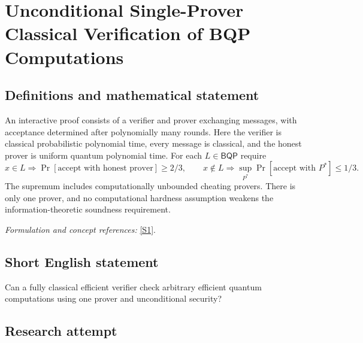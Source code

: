\documentclass[11pt,a4paper]{article}
\newcommand{\sref}[2]{\hyperlink{source:#1:#2}{[S#2]}}
\newif\ifshowcatalogue
\newcommand{\cataloguescope}[1]{\ifshowcatalogue
 \paragraph{Exact scope in the supplied catalogue.}
 \begin{quote}\small #1\end{quote}\fi}
\numberwithin{equation}{section}
\begin{document}
\setcounter{section}{0}
\setlength{\parskip}{3pt plus 1pt}
\clearpage
\section*{\texorpdfstring{Unconditional Single-Prover Classical Verification of BQP Computations}{Unconditional Single-Prover Classical Verification of BQP Computations}}\label{statement}
\subsection{Definitions and mathematical statement}
An interactive proof consists of a verifier and prover exchanging messages, with acceptance determined after polynomially many rounds. Here the verifier is classical probabilistic polynomial time, every message is classical, and the honest prover is uniform quantum polynomial time. For each $L\in\mathsf{BQP}$ require
\[
 x\in L\Rightarrow\Pr[\text{accept with honest prover}]\ge2/3,\qquad
 x\notin L\Rightarrow\sup_{P^*}\Pr[\text{accept with }P^*]\le1/3.
\]
The supremum includes computationally unbounded cheating provers. There is only one prover, and no computational hardness assumption weakens the information-theoretic soundness requirement.
\par\smallskip\textit{Formulation and concept references:} \sref{statement}{1}.
\cataloguescope{Determine whether every language L in BQP admits a polynomial-round interactive proof with only classical messages between a probabilistic classical polynomial-time verifier and a single honest uniform quantum polynomial-time prover, with completeness at least 2/3 and soundness at most 1/3 against every computationally unbounded cheating prover.}
\subsection{Short English statement}
Can a fully classical efficient verifier check arbitrary efficient quantum computations using one prover and unconditional security?
\subsection{Research attempt}
\end{document}
